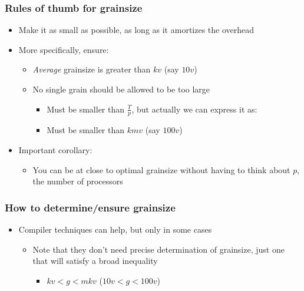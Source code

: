 \begin{frame}
  \frametitle{Rules of thumb for grainsize}
  \begin{itemize}
    \item Make it as small as possible, as long as it amortizes the overhead
    \item More specifically, ensure:
      \begin{itemize}
      \item \textit{Average} grainsize is greater than $kv$ (say $10v$)
      \item No single grain should be allowed to be too large 
        \begin{itemize}
          \item Must be smaller than $\frac{T}{p}$, but actually we can express
            it as:
          \item Must be smaller than $kmv$ (say $100v$)
        \end{itemize}
      \end{itemize}
    \item Important corollary:
      \begin{itemize}
      \item You can be at close to optimal grainsize without having to think
        about $p$, the number of processors
      \end{itemize}
  \end{itemize}
\end{frame}

\begin{frame}
  \frametitle{How to determine/ensure grainsize}
  \begin{itemize}
    \item Compiler techniques can help, but only in some cases
      \begin{itemize}
        \item Note that they don't need precise determination of grainsize,
          just one that will satisfy a broad inequality
          \begin{itemize}
            \item $kv < g < mkv$ ($10v < g < 100v$)
          \end{itemize}
      \end{itemize}
  \end{itemize}
\end{frame}


